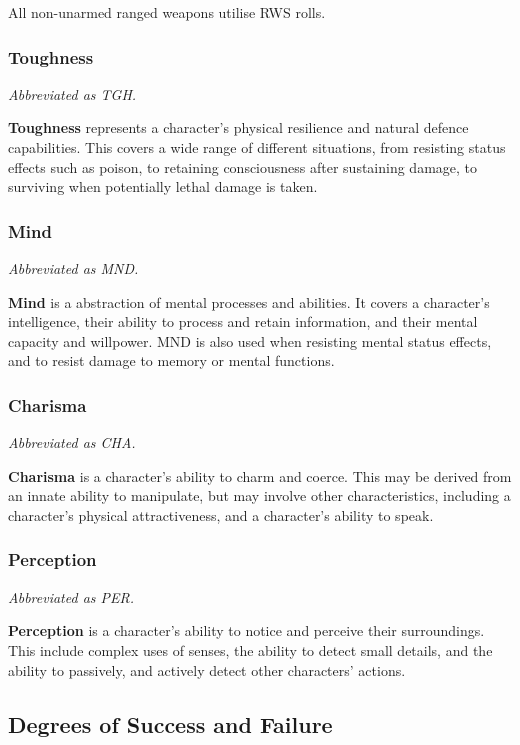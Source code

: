 \documentclass[]{article}
\begin{document}
All non-unarmed ranged weapons utilise RWS rolls.

\subsubsection{Toughness}\label{toughness}

\emph{Abbreviated as TGH.}

\textbf{Toughness} represents a character's physical resilience and
natural defence capabilities. This covers a wide range of different
situations, from resisting status effects such as poison, to retaining
consciousness after sustaining damage, to surviving when potentially
lethal damage is taken.

\subsubsection{Mind}\label{mind}

\emph{Abbreviated as MND.}

\textbf{Mind} is a abstraction of mental processes and abilities. It
covers a character's intelligence, their ability to process and retain
information, and their mental capacity and willpower. MND is also used
when resisting mental status effects, and to resist damage to memory or
mental functions.

\subsubsection{Charisma}\label{charisma}

\emph{Abbreviated as CHA.}

\textbf{Charisma} is a character's ability to charm and coerce. This may
be derived from an innate ability to manipulate, but may involve other
characteristics, including a character's physical attractiveness, and a
character's ability to speak.

\subsubsection{Perception}\label{perception}

\emph{Abbreviated as PER.}

\textbf{Perception} is a character's ability to notice and perceive
their surroundings. This include complex uses of senses, the ability to
detect small details, and the ability to passively, and actively detect
other characters' actions.

\subsection{Degrees of Success and
Failure}\label{degrees-of-success-and-failure}
\end{document}
